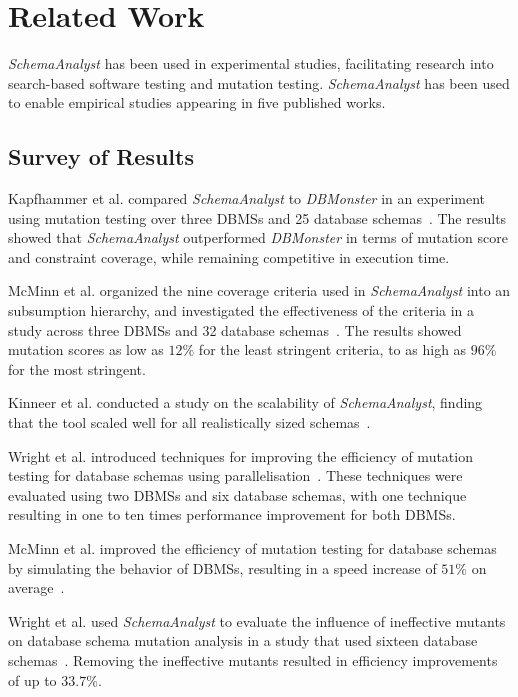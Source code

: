 \section{Related Work}\label{sec:relatedwork}

\textit{SchemaAnalyst} has been used in experimental studies, facilitating research into
search-based software testing and mutation testing.  \textit{SchemaAnalyst} has been used to enable
empirical studies appearing in five published works. 
\subsection{Survey of Results}

Kapfhammer et al. compared \textit{SchemaAnalyst} to \textit{DBMonster}
in an experiment using mutation testing over three DBMSs and 25 database 
schemas~\cite{kapfhammer2013search}. The results showed that \textit{SchemaAnalyst} outperformed
\textit{DBMonster} in terms of mutation score and constraint coverage, while remaining competitive
in execution time.

McMinn et al. organized the nine coverage criteria used in \textit{SchemaAnalyst} into an subsumption
hierarchy, and investigated the effectiveness of the criteria in a study across
three DBMSs and 32 database schemas~\cite{mcminn2015effectiveness}.  The results showed mutation
scores as low as $12\%$ for the least stringent criteria, to as high as $96\%$ for the most stringent.

Kinneer et al. conducted a study on the scalability of \textit{SchemaAnalyst}, finding that the tool
scaled well for all realistically sized schemas~\cite{kinneer2015automatically, Kinneer2015a}.

Wright et al. introduced techniques for improving the efficiency of mutation testing for database
schemas using parallelisation~\cite{wright2013efficient}. These techniques were evaluated using two
DBMSs and six database schemas, with one technique resulting in one to ten times performance
improvement for both DBMSs.

McMinn et al. improved the efficiency of mutation testing for database schemas by
simulating the behavior of DBMSs, resulting in a speed increase of $51\%$ on average~\cite{mcminn2016virtual}.

Wright et al. used \textit{SchemaAnalyst} to evaluate the influence of ineffective mutants on
database schema mutation analysis in a study that used sixteen database
schemas~\cite{wright2014impact}. Removing the ineffective mutants resulted in efficiency
improvements of up to $33.7\%$.

